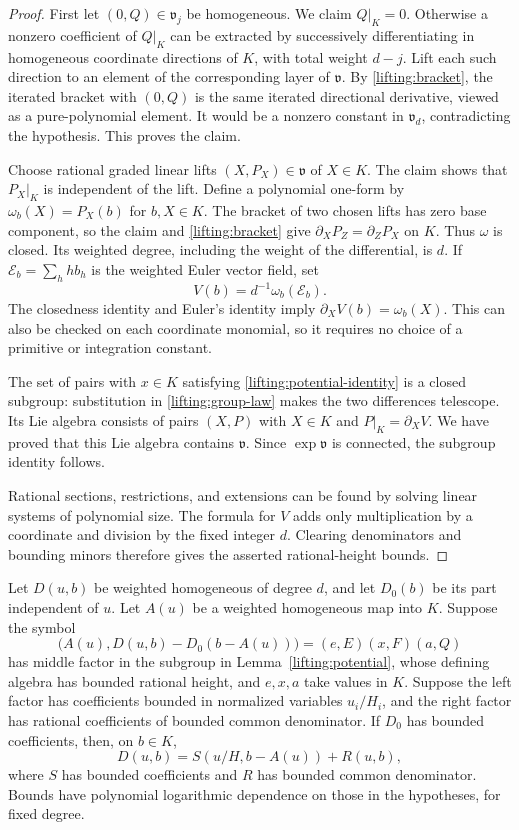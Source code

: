 \begin{proof}
First let $(0,Q)\in\mathfrak v_j$ be homogeneous.  We claim
$Q|_K=0$.  Otherwise a nonzero coefficient of $Q|_K$ can be extracted
by successively differentiating in homogeneous coordinate directions
of $K$, with total weight $d-j$.  Lift each such direction to an
element of the corresponding layer of $\mathfrak v$.
By \eqref{lifting:bracket}, the iterated bracket with $(0,Q)$ is the
same iterated directional derivative, viewed as a pure-polynomial
element.  It would be a nonzero constant in $\mathfrak v_d$,
contradicting the hypothesis.  This proves the claim.

Choose rational graded linear lifts $(X,P_X)\in\mathfrak v$ of
$X\in K$.  The claim shows that $P_X|_K$ is independent of the lift.
Define a polynomial one-form by
$\omega_b(X)=P_X(b)$ for $b,X\in K$.
The bracket of two chosen lifts has zero base component, so the claim
and \eqref{lifting:bracket} give
$\partial_XP_Z=\partial_ZP_X$ on $K$.  Thus $\omega$ is closed.
Its weighted degree, including the weight of the differential, is
$d$.  If $\mathcal E_b=\sum_h h b_h$ is the weighted Euler vector
field, set
\[
                  V(b)=d^{-1}\omega_b(\mathcal E_b).
\]
The closedness identity and Euler's identity imply
$\partial_X V(b)=\omega_b(X)$.
This can also be checked on each coordinate monomial, so it requires
no choice of a primitive or integration constant.

The set of pairs with $x\in K$ satisfying
\eqref{lifting:potential-identity} is a closed subgroup: substitution
in \eqref{lifting:group-law} makes the
two differences telescope.  Its Lie algebra consists of pairs
$(X,P)$ with $X\in K$ and $P|_K=\partial_XV$.  We have proved that this Lie algebra
contains $\mathfrak v$.  Since $\exp\mathfrak v$ is connected, the
subgroup identity follows.

Rational sections, restrictions, and extensions can be found by
solving linear systems of polynomial size.  The formula for $V$ adds
only multiplication by a coordinate and division by the fixed integer
$d$.  Clearing denominators and bounding minors therefore gives the
asserted rational-height bounds.
\end{proof}

\begin{lemma}
\label{lifting:algebraic-major}
Let $D(u,b)$ be weighted homogeneous of degree $d$, and let $D_0(b)$
be its part independent of $u$.  Let $A(u)$ be a weighted homogeneous
map into $K$.  Suppose the symbol
\[
 \bigl(A(u),D(u,b)-D_0(b-A(u))\bigr)
       =(e,E)(x,F)(a,Q)
\]
has middle factor in the subgroup in
Lemma~\ref{lifting:potential}, whose defining algebra has bounded
rational height, and $e,x,a$ take values in $K$.
Suppose the left factor has coefficients bounded in normalized
variables $u_i/H_i$, and the right factor has rational coefficients
of bounded common denominator.  If $D_0$ has bounded coefficients,
then, on $b\in K$,
\[
 D(u,b)=S(u/H,b-A(u))+R(u,b),
\]
where $S$ has bounded coefficients and $R$ has bounded common
denominator.  Bounds have polynomial logarithmic dependence on those
in the hypotheses, for fixed degree.
\end{lemma}

